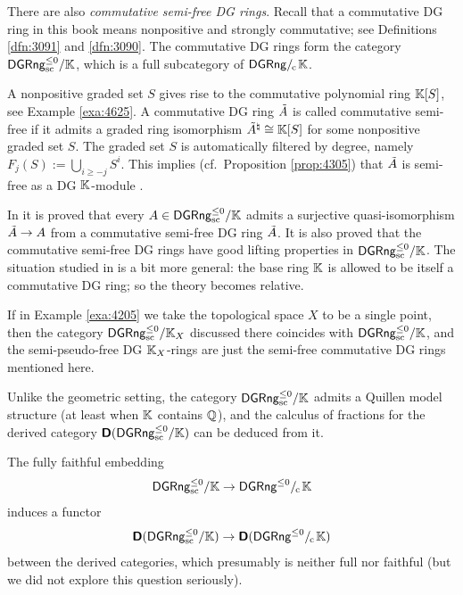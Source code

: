 \begin{rem} \label{rem:4945}
There are also {\em commutative semi-free DG rings}.
Recall that a commutative DG ring in this book means nonpositive and strongly 
commutative; see Definitions \ref{dfn:3091} and \ref{dfn:3090}. The
commutative DG rings form the 
category $\mathrm{\mathsf{DGRng}}^{\leq 0}_{\mathrm{sc}} / \mathbb{K}$,
which is a full subcategory of 
$\mathrm{\mathsf{DGRng}} /_{\mspace{-2mu} \mathrm{c}} \mspace{2mu} \mathbb{K}$.

A nonpositive graded set $S$ gives rise to the commutative polynomial ring 
$\mathbb{K}[S]$, see Example \ref{exa:4625}. 
A commutative DG ring $\tilde{A}$ is called commutative semi-free if it admits    
a graded ring isomorphism $\tilde{A}^{\natural} \cong \mathbb{K}[S]$ for some 
nonpositive graded set $S$. The graded set $S$ is automatically filtered by 
degree, namely $F_j(S) := \bigcup_{i \geq -j} S^i$.
This implies (cf.\ Proposition \ref{prop:4305})
that $\tilde{A}$ is semi-free as a DG $\mathbb{K}$-module . 

In \cite{Ye9} it is proved that every 
$A \in \mathrm{\mathsf{DGRng}}^{\leq 0}_{\mathrm{sc}} / \mathbb{K}$
admits a surjective quasi-isomorphism $\tilde{A} \to A$ from a 
commutative semi-free DG ring $\tilde{A}$. 
It is also proved that the commutative semi-free DG rings have good lifting 
properties in $\mathrm{\mathsf{DGRng}}^{\leq 0}_{\mathrm{sc}} / \mathbb{K}$. 
The situation studied in \cite{Ye9} is a bit more general: the base ring $\mathbb{K}$ 
is allowed to be itself a commutative DG ring; so the theory becomes 
relative. 

If in Example \ref{exa:4205} we take the topological space $X$ to be a 
single point, then the category 
$\mathrm{\mathsf{DGRng}}^{\leq 0}_{\mathrm{sc}} / \mathbb{K}_X$
discussed there coincides with 
$\mathrm{\mathsf{DGRng}}^{\leq 0}_{\mathrm{sc}} / \mathbb{K}$,
and the semi-pseudo-free DG $\mathbb{K}_X$-rings are just the semi-free commutative DG 
rings mentioned here. 

Unlike the geometric setting, the category 
$\mathrm{\mathsf{DGRng}}^{\leq 0}_{\mathrm{sc}} / \mathbb{K}$
admits a Quillen model structure (at least when $\mathbb{K}$ contains $\mathbb{Q}$),
and the calculus of fractions for the derived category 
$\boldsymbol{\mathsf{D}}(\mathrm{\mathsf{DGRng}}^{\leq 0}_{\mathrm{sc}} / \mathbb{K})$
can be deduced from it. 

The fully faithful embedding 
\[ \mathrm{\mathsf{DGRng}}^{\leq 0}_{\mathrm{sc}} / \mathbb{K} \to 
\mathrm{\mathsf{DGRng}}^{\leq 0} /_{\mspace{-2mu} \mathrm{c}} \mspace{2mu} \mathbb{K} \]
induces a functor 
\[ \boldsymbol{\mathsf{D}}(\mathrm{\mathsf{DGRng}}^{\leq 0}_{\mathrm{sc}} / \mathbb{K}) \to
\boldsymbol{\mathsf{D}}(\mathrm{\mathsf{DGRng}}^{\leq 0} /_{\mspace{-2mu} \mathrm{c}} \mspace{2mu} \mathbb{K}) \]
between the derived categories, which presumably is neither full nor 
faithful (but we did not explore this question seriously). 
\end{rem}




